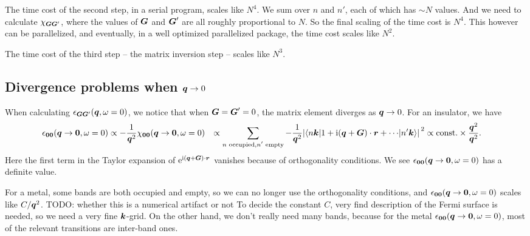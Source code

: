 \documentclass[hyperref, a4paper]{report}
\newcommand*{\ii}{\mathrm{i}}
\newcommand*{\ee}{\mathrm{e}}
\newcommand*{\const}{\mathrm{const}}
\def\\{}%
\begin{document}
The time cost of the second step, 
in a serial program, scales like $N^4$.
We sum over $n$ and $n'$,
each of which has $\sim N$ values.
And we need to calculate $\chi_{\vb*{G} \vb*{G}'}$,
where the values of $\vb*{G}$ and $\vb*{G}'$ are all roughly proportional to $N$.
So the final scaling of the time cost is $N^4$.
This however can be parallelized,
and eventually, in a well optimized parallelized package,
the time cost scales like $N^2$.

The time cost of the third step -- the matrix inversion step -- 
scales like $N^3$.

\subsection{Divergence problems when $\vb*{q} \to 0$}

When calculating $\epsilon_{\vb*{G} \vb*{G}'}(\vb*{q}, \omega = 0)$,
we notice that when $\vb*{G} = \vb*{G}' = 0$,
the matrix element diverges as $\vb*{q} \to 0$.
For an insulator, we have 
\begin{equation}
    \begin{aligned}
        \epsilon_{\vb*{0} \vb*{0}} (\vb*{q} \to \vb*{0}, \omega = 0)
        &\propto - \frac{1}{\vb*{q}^2} \chi_{\vb*{0} \vb*{0}} (\vb*{q} \to \vb*{0}, \omega = 0) \\
        &\propto \sum_{\text{$n$ occupied}, \text{$n'$ empty}} - \frac{1}{\vb*{q}^2} 
        \abs*{
            \mel**{n \vb*{k}}{1 + \ii (\vb*{q} + \vb*{G}) \cdot \vb*{r} + \cdots }{n' \vb*{k}}
        }^2 \\
        &\propto \const. \times \frac{\vb*{q}^2}{\vb*{q}^2}.
    \end{aligned}
\end{equation}
Here the first term in the Taylor expansion of $\ee^{\ii (\vb*{q} + \vb*{G}) \cdot \vb*{r}}$ vanishes
because of orthogonality conditions.
We see $\epsilon_{\vb*{0} \vb*{0}} (\vb*{q} \to \vb*{0}, \omega = 0)$
has a definite value.

For a metal, some bands are both occupied and empty,
so we can no longer use the orthogonality conditions,
and $\epsilon_{\vb*{0} \vb*{0}} (\vb*{q} \to \vb*{0}, \omega = 0)$ 
scales like $C / \vb*{q}^2$.
TODO: whether this is a numerical artifact or not 
To decide the constant $C$,
very find description of the Fermi surface is needed,
so we need a very fine $\vb*{k}$-grid.
On the other hand, 
we don't really need many bands,
because for the metal $\epsilon_{\vb*{0} \vb*{0}} (\vb*{q} \to \vb*{0}, \omega = 0)$,
most of the relevant transitions are inter-band ones.
\end{document}
